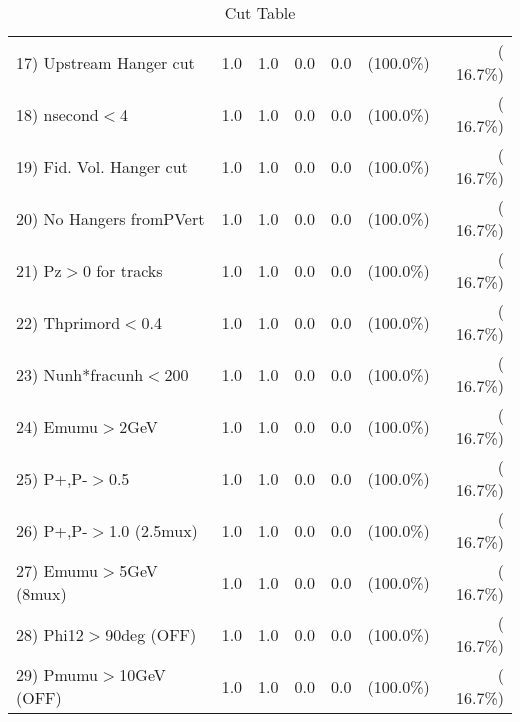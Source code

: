 \begin{table}[h!]
\begin{tabular}{||l||r|r|r|r|r|r||}
 17) Upstream Hanger cut  &          1.0 &          1.0 &          0.0 &          0.0 & (100.0\%) & ( 16.7\%) \\
 18) nsecond$<$4          &          1.0 &          1.0 &          0.0 &          0.0 & (100.0\%) & ( 16.7\%) \\
 19) Fid. Vol. Hanger cut &          1.0 &          1.0 &          0.0 &          0.0 & (100.0\%) & ( 16.7\%) \\
 20) No Hangers fromPVert &          1.0 &          1.0 &          0.0 &          0.0 & (100.0\%) & ( 16.7\%) \\
 21) Pz$>$0 for tracks    &          1.0 &          1.0 &          0.0 &          0.0 & (100.0\%) & ( 16.7\%) \\
 22) Thprimord$<$0.4      &          1.0 &          1.0 &          0.0 &          0.0 & (100.0\%) & ( 16.7\%) \\
 23) Nunh*fracunh$<$200   &          1.0 &          1.0 &          0.0 &          0.0 & (100.0\%) & ( 16.7\%) \\
 24) Emumu$>$2GeV         &          1.0 &          1.0 &          0.0 &          0.0 & (100.0\%) & ( 16.7\%) \\
 25) P+,P-$>$0.5          &          1.0 &          1.0 &          0.0 &          0.0 & (100.0\%) & ( 16.7\%) \\
 26) P+,P-$>$1.0 (2.5mux) &          1.0 &          1.0 &          0.0 &          0.0 & (100.0\%) & ( 16.7\%) \\
 27) Emumu$>$5GeV  (8mux) &          1.0 &          1.0 &          0.0 &          0.0 & (100.0\%) & ( 16.7\%) \\
 28) Phi12$>$90deg  (OFF) &          1.0 &          1.0 &          0.0 &          0.0 & (100.0\%) & ( 16.7\%) \\
 29) Pmumu$>$10GeV  (OFF) &          1.0 &          1.0 &          0.0 &          0.0 & (100.0\%) & ( 16.7\%) \\
 \hline
 \hline
 \end{tabular}
 \caption{Cut Table           }
 \label{tab-cutheavy_neutrino_1.000}
 \end{table}
